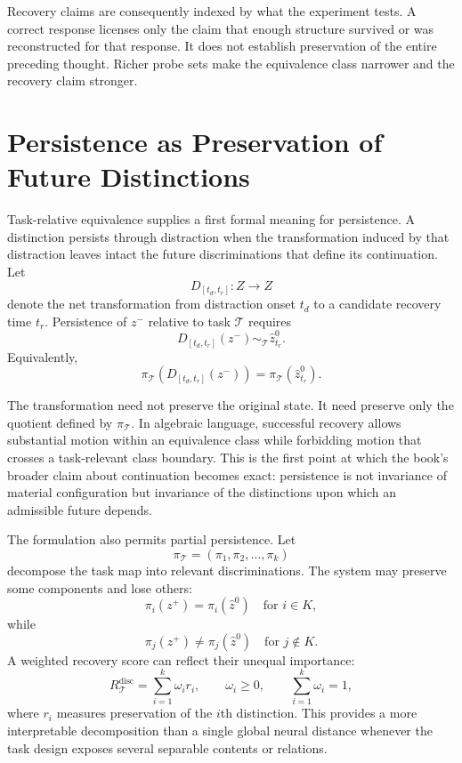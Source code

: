 \documentclass[11pt]{book}
\begin{document}
Recovery claims are consequently indexed by what the experiment tests. A correct response licenses only the claim that enough structure survived or was reconstructed for that response. It does not establish preservation of the entire preceding thought. Richer probe sets make the equivalence class narrower and the recovery claim stronger.

\section*{Persistence as Preservation of Future Distinctions}

Task-relative equivalence supplies a first formal meaning for persistence. A distinction persists through distraction when the transformation induced by that distraction leaves intact the future discriminations that define its continuation. Let
\[
D_{[t_d,t_r]}:Z\longrightarrow Z
\]
denote the net transformation from distraction onset $t_d$ to a candidate recovery time $t_r$. Persistence of $z^{-}$ relative to task $\mathcal T$ requires
\[
D_{[t_d,t_r]}(z^{-})
\sim_{\mathcal T}
\widehat z^{0}_{t_r}.
\]
Equivalently,
\[
\pi_{\mathcal T}
\!\left(
D_{[t_d,t_r]}(z^{-})
\right)
=
\pi_{\mathcal T}
\!\left(
\widehat z^{0}_{t_r}
\right).
\]

The transformation need not preserve the original state. It need preserve only the quotient defined by $\pi_{\mathcal T}$. In algebraic language, successful recovery allows substantial motion within an equivalence class while forbidding motion that crosses a task-relevant class boundary. This is the first point at which the book's broader claim about continuation becomes exact: persistence is not invariance of material configuration but invariance of the distinctions upon which an admissible future depends.

The formulation also permits partial persistence. Let
\[
\pi_{\mathcal T}
=
(\pi_1,\pi_2,\ldots,\pi_k)
\]
decompose the task map into relevant discriminations. The system may preserve some components and lose others:
\[
\pi_i(z^{+})=\pi_i(\widehat z^{0})
\quad\text{for }i\in K,
\]
while
\[
\pi_j(z^{+})\neq\pi_j(\widehat z^{0})
\quad\text{for }j\notin K.
\]
A weighted recovery score can reflect their unequal importance:
\[
R_{\mathcal T}^{\mathrm{disc}}
=
\sum_{i=1}^{k}
\omega_i r_i,
\qquad
\omega_i\geq 0,
\qquad
\sum_{i=1}^{k}\omega_i=1,
\]
where $r_i$ measures preservation of the $i$th distinction. This provides a more interpretable decomposition than a single global neural distance whenever the task design exposes several separable contents or relations.
\end{document}
